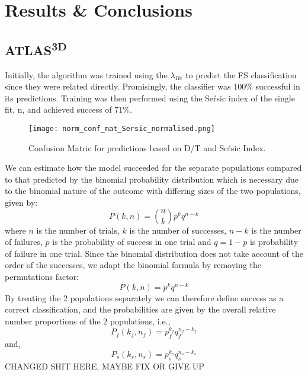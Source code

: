 \chapter{Results \& Conclusions}

\label{ch:results}

\section{ATLAS\textsuperscript{3D}}
Initially, the algorithm was trained using the $\lambda_{Re}$ to predict the FS classification since they were related directly. Promisingly, the classifier was 100\% successful in its predictions. Training was then performed using the Se\'rsic index of the single fit, n, and achieved success of 71\%.
\begin{figure}[h!]
	\centering
	\texttt{[image: norm\_conf\_mat\_Sersic\_normalised.png]}
	\caption{Confusion Matric for predictions based on D/T and Se\'rsic Index.
	}
	\label{fig:confmatDT}
\end{figure}
We can estimate how the model succeeded for the separate populations compared to that predicted by the binomial probability distribution which is necessary due to the binomial nature of the outcome with differing sizes of the two populations, given by\cite{simmons_2016}:
\begin{equation}
P(k,n) = \binom{n}{k}p^{k}q^{n-k}
\end{equation}
where $n$ is the number of trials, $k$ is the number of successes, $n-k$ is the number of failures, $p$ is the probability of success in one trial and $q=1-p$ is probability of failure in one trial. Since the binomial distribution does not take account of the order of the successes, we adapt the binomial formula by removing the permutations factor:
\begin{equation}
P(k,n) = p^{k}q^{n-k}
\end{equation}
By treating the 2 populations separately we can therefore define success as a correct classification, and the probabilities are given by the overall relative number proportions of the 2 populations, i.e.,
\begin{equation}
P_{f}(k_{f},n_{f}) = p_{f}^{k_{f}}q_{f}^{n_{f}-k_{f}}
\end{equation}
and,
\begin{equation}
P_{s}(k_{s},n_{s}) = p_{s}^{k_{s}}q_{s}^{n_{s}-k_{s}}
\end{equation}
CHANGED SHIT HERE, MAYBE FIX OR GIVE UP
